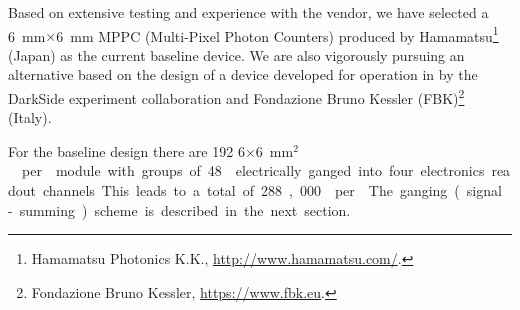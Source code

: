 Based on extensive testing and experience with the vendor, we have selected a \SI{6}{mm}$\times$\SI{6}{mm} MPPC (Multi-Pixel Photon Counters) produced by Hamamatsu\footnote{Hamamatsu\texttrademark{} Photonics K.K., \url{http://www.hamamatsu.com/}.} (Japan) as the current baseline device. %
We are also vigorously pursuing an alternative based on the design of a device developed for operation in \lar by the DarkSide experiment collaboration and Fondazione Bruno Kessler (FBK)\footnote{Fondazione Bruno Kessler\texttrademark{}, \url{https://www.fbk.eu}.} (Italy).

For the baseline  design there are 192 \num{6}$\times$\SI{6}{mm$^2$}  per  module with groups of 48  electrically ganged into four electronics readout channels. This leads to a total of 288,000  per . The ganging (signal-summing) scheme is described in the next section.





